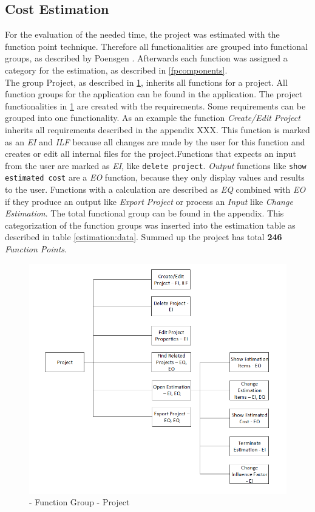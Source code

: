 \subsection{Cost Estimation}
For the evaluation of the needed time, the project was estimated with the function point technique. Therefore all functionalities are grouped into functional groups, as described by Poensgen \cite{FPKompakt}. Afterwards each function was assigned a category for the estimation, as described in \ref{fpcomponents}.\\
The group Project, as described in \ref{fig:projectFunctionalityGroup}, inherits all functions for a project. All function groups for the application can be found in the application. The project functionalities in \ref{fig:projectFunctionalityGroup} are created with the requirements. Some requirements can be grouped into one functionality. As an example the function \textit{Create/Edit Project} inherits all requirements described in the appendix XXX. This function is marked as an \textit{EI} and \textit{ILF} because all changes are made by the user for this function and creates or edit all internal files for the project.Functions that expects an input from the user are marked as \textit{EI}, like \texttt{delete project}. \textit{Output} functions like \texttt{show estimated cost} are a \textit{EO} function, because they only display values and results to the user. Functions with a calculation are described as \textit{EQ} combined with \textit{EO} if they produce an output like \textit{Export Project} or process an \textit{Input} like \textit{Change Estimation}. The total functional group can be found in the appendix. This categorization of the function groups was inserted into the estimation table as described in table \ref{estimation:data}. Summed up the project has total \textbf{246} \textit{Function Points}.
\begin{figure}[h] 
	\centering 
	\includegraphics[width=14cm]{images/ScreenOverviewProject.PNG} 
	\caption{- Function Group - Project} 
	\label{fig:projectFunctionalityGroup}
\end{figure}
